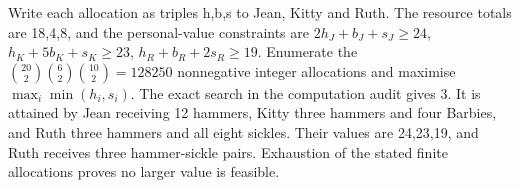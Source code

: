 Write each allocation as triples h,b,s to Jean, Kitty and Ruth. The resource totals are 18,4,8, and the personal-value constraints are $2h_J+b_J+s_J\ge24$, $h_K+5b_K+s_K\ge23$, $h_R+b_R+2s_R\ge19$. Enumerate the $\binom{20}2\binom62\binom{10}2=128250$ nonnegative integer allocations and maximise $\max_i\min(h_i,s_i)$. The exact search in the computation audit gives $\boxed3$. It is attained by Jean receiving 12 hammers, Kitty three hammers and four Barbies, and Ruth three hammers and all eight sickles. Their values are 24,23,19, and Ruth receives three hammer-sickle pairs. Exhaustion of the stated finite allocations proves no larger value is feasible.

